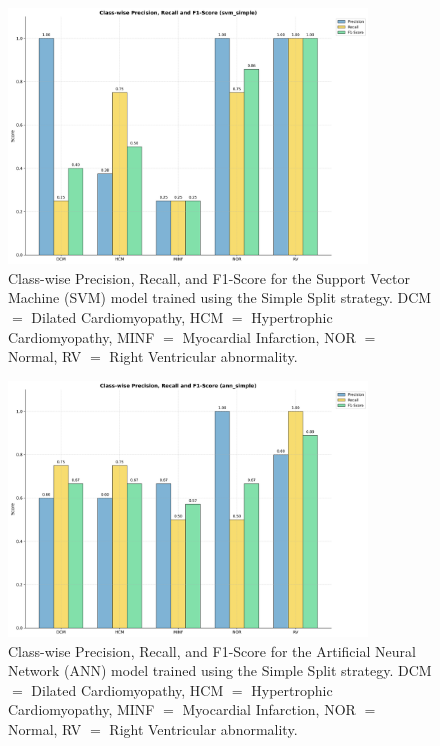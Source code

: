 \begin{figure}
	\begin{center}
		\includegraphics[width=0.85\textwidth]{../images/metrics/svm/svm_simple_class_wise_metrics.png}
	\end{center}
	\caption{Class-wise Precision, Recall, and F1-Score for the Support Vector
		Machine (SVM) model trained using the Simple Split strategy. DCM $=$ Dilated
		Cardiomyopathy, HCM $=$ Hypertrophic Cardiomyopathy, MINF $=$ Myocardial
		Infarction, NOR $=$ Normal, RV $=$ Right Ventricular abnormality.}
\end{figure}

\begin{figure}
	\begin{center}
		\includegraphics[width=0.85\textwidth]{../images/metrics/ann/ann_simple_class_wise_metrics.png}
	\end{center}
	\caption{Class-wise Precision, Recall, and F1-Score for the Artificial Neural
		Network (ANN) model trained using the Simple Split strategy. DCM $=$ Dilated
		Cardiomyopathy, HCM $=$ Hypertrophic Cardiomyopathy, MINF $=$ Myocardial
		Infarction, NOR $=$ Normal, RV $=$ Right Ventricular abnormality.}
\end{figure}

